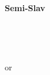 \begin{center}\textbf{Semi-Slav}\\\end{center}
\newgame
{}\\
\notationoff
\begin{center}\showboard\\\end{center}
 or 
